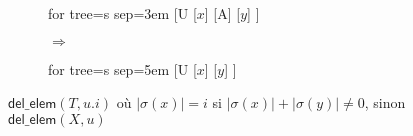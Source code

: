\begin{figure}[H]
	\centering
	\begin{subfigure}{0.4\textwidth}
		\centering
		\begin{adjustbox}{valign=c, max width=\textwidth}
			\begin{forest}
			for tree={s sep=3em}
			[U
				[$x$]
				[A]
				[$y$]
			]
			\end{forest}
		\end{adjustbox}
		\caption{}
	\end{subfigure}
	\begin{subfigure}{0.1\textwidth}
		\centering
		\huge{$\Rightarrow$}
	\end{subfigure}
	\begin{subfigure}{0.4\textwidth}
		\centering
		\begin{adjustbox}{valign=c, max width=\textwidth}
			\begin{forest}
			for tree={s sep=5em}
			[U
				[$x$]
				[$y$]
			]
			\end{forest}
		\end{adjustbox}
		\caption{}
	\end{subfigure}
	\caption{$\textsf{del\_elem}(T, u.i)$ où $|\sigma(x)| = i$ si $|\sigma(x)| + |\sigma(y)| \neq 0$, sinon $\textsf{del\_elem}(X, u)$}
	\label{fig:sch:op:insElem}
\end{figure}



